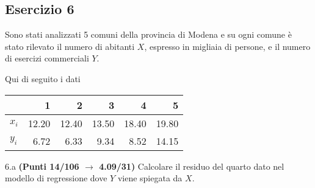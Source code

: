 \documentclass[
  11pt,
]{book}
\theoremstyle{mytheoremstyle}
\theoremstyle{mydefstyle}
\begin{document}
\subsection{Esercizio 6}\label{esercizio-6-11}

Sono stati analizzati 5 comuni della provincia di Modena e su ogni comune è stato rilevato
il numero di abitanti \(X\), espresso in migliaia di persone, e il numero di esercizi commerciali \(Y\).

Qui di seguito i dati

\begin{table}[H]
\centering
\begin{tabular}{lrrrrr}
\toprule
  & 1 & 2 & 3 & 4 & 5\\
\midrule
$x_i$ & 12.20 & 12.40 & 13.50 & 18.40 & 19.80\\
$y_i$ & 6.72 & 6.33 & 9.34 & 8.52 & 14.15\\
\bottomrule
\end{tabular}
\end{table}

6.a \textbf{(Punti 14/106 \(\rightarrow\) 4.09/31)} Calcolare il residuo del quarto dato nel modello di regressione dove \(Y\) viene spiegata da \(X\).
\end{document}
